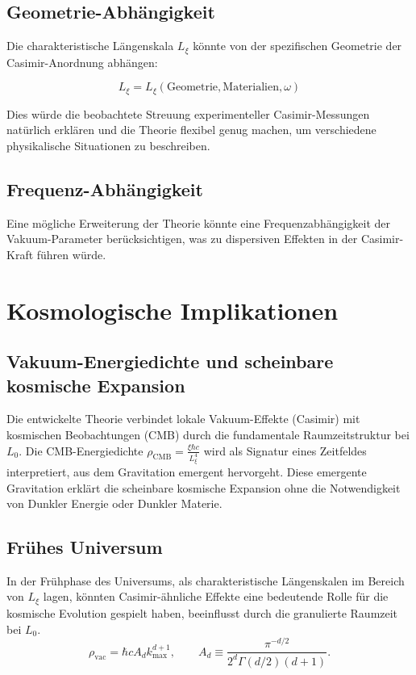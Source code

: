 	\subsection{Geometrie-Abhängigkeit}
	
	Die charakteristische Längenskala \( L_\xi \) könnte von der spezifischen Geometrie der Casimir-Anordnung abhängen:
	
	\begin{equation}
		L_\xi = L_\xi(\text{Geometrie}, \text{Materialien}, \omega) \label{eq:Lxi_dependencies}
	\end{equation}
	
	Dies würde die beobachtete Streuung experimenteller Casimir-Messungen natürlich erklären und die Theorie flexibel genug machen, um verschiedene physikalische Situationen zu beschreiben.
	
	\subsection{Frequenz-Abhängigkeit}
	
	Eine mögliche Erweiterung der Theorie könnte eine Frequenzabhängigkeit der Vakuum-Parameter berücksichtigen, was zu dispersiven Effekten in der Casimir-Kraft führen würde.
	
	\section{Kosmologische Implikationen}
	
	\subsection{Vakuum-Energiedichte und scheinbare kosmische Expansion}
	
	Die entwickelte Theorie verbindet lokale Vakuum-Effekte (Casimir) mit kosmischen Beobachtungen (CMB) durch die fundamentale Raumzeitstruktur bei \( L_0 \). Die CMB-Energiedichte \( \rho_{\text{CMB}} = \frac{\xi \hbar c}{L_\xi^4} \) wird als Signatur eines Zeitfeldes interpretiert, aus dem Gravitation emergent hervorgeht. Diese emergente Gravitation erklärt die scheinbare kosmische Expansion ohne die Notwendigkeit von Dunkler Energie oder Dunkler Materie.
	
	\subsection{Frühes Universum}
	
	In der Frühphase des Universums, als charakteristische Längenskalen im Bereich von \( L_\xi \) lagen, könnten Casimir-ähnliche Effekte eine bedeutende Rolle für die kosmische Evolution gespielt haben, beeinflusst durch die granulierte Raumzeit bei \( L_0 \).
	\begin{equation}	
		\rho_{\mathrm{vac}} = \hbar c  A_d  k_{\max}^{d+1},
		\qquad
		A_d \equiv \frac{\pi^{-d/2}}{2^d\Gamma(d/2)(d+1)}.
	\end{equation}
	
